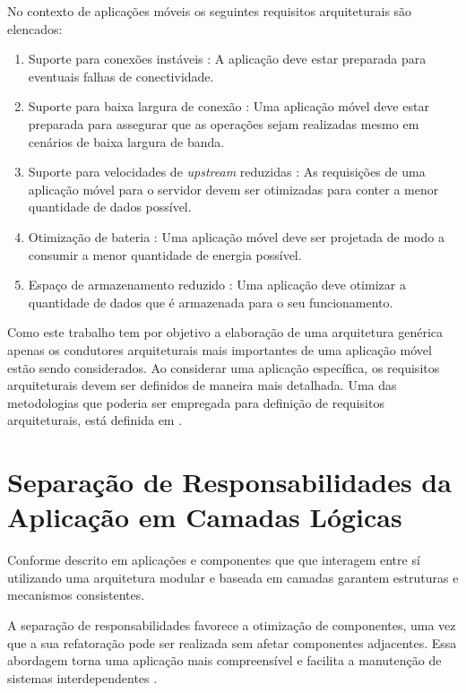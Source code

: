 \documentclass[
	article,			%
	11pt,				%
	oneside,			%
	a4paper,			%
	english,			%
	brazil,				%
	sumario=tradicional
]{abntex2}
\begin{document}
No contexto de aplicações móveis os seguintes requisitos arquiteturais são elencados:
\begin{enumerate}
	\item Suporte para conexões instáveis \cite{tiffany2008guide}: A aplicação deve estar preparada para eventuais falhas de conectividade.
	
	\item Suporte para baixa largura de conexão \cite{tiffany2008guide}: Uma aplicação móvel deve estar preparada para assegurar que as operações sejam realizadas mesmo em cenários de baixa largura de banda.
	
	\item Suporte para velocidades de \emph{upstream} reduzidas \cite{rathore2007overview}: As requisições de uma aplicação móvel para o servidor devem ser otimizadas para conter a menor quantidade de dados possível.
	
	\item Otimização de bateria \cite{rathore2007overview}: Uma aplicação móvel deve ser projetada de modo a consumir a menor quantidade de energia possível.
	
	\item Espaço de armazenamento reduzido \cite{tiffany2008guide}: Uma aplicação deve otimizar a quantidade de dados que é armazenada para o seu funcionamento.
	
\end{enumerate}

Como este trabalho tem por objetivo a elaboração de uma arquitetura genérica apenas os condutores arquiteturais mais importantes de uma aplicação móvel estão sendo considerados. Ao considerar uma aplicação específica, os requisitos arquiteturais devem ser definidos de maneira mais detalhada. Uma das metodologias que poderia ser empregada para definição de requisitos arquiteturais, está definida em \cite{eeles2005capturing}.

\section{Separação de Responsabilidades da Aplicação em Camadas Lógicas}

Conforme descrito em \cite{griss1998architecting} aplicações e componentes que que interagem entre sí utilizando uma arquitetura modular e baseada em camadas garantem estruturas e mecanismos consistentes.

A separação de responsabilidades favorece a otimização de componentes, uma vez que a sua refatoração pode ser realizada sem afetar componentes adjacentes. Essa abordagem torna uma aplicação mais compreensível e facilita a manutenção de sistemas interdependentes \cite{meier2009microsoft}.
\end{document}
